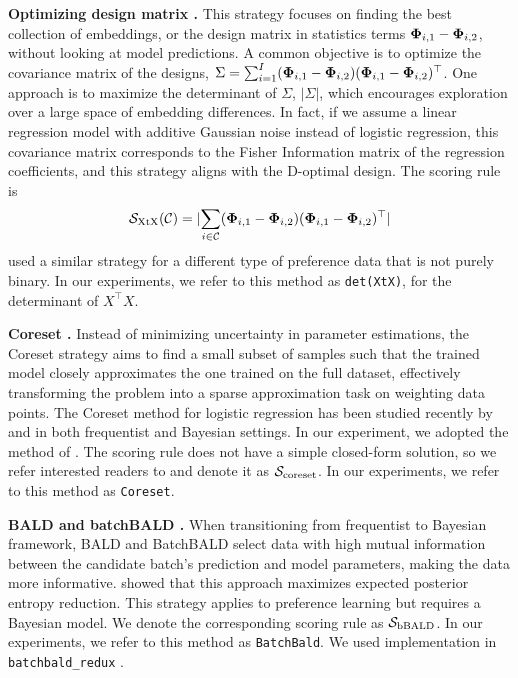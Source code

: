 \textbf{Optimizing design matrix \citep{mukherjee2024optimal}.} 
This strategy focuses on finding the best collection of embeddings, or the design matrix in statistics terms $\bm{\Phi}_{i,1} - \bm{\Phi}_{i,2}$, without looking at model predictions. A common objective is to optimize the covariance matrix of the designs, $\Sigma = \sum_{i=1}^I (\bm{\Phi}_{i,1} - \bm{\Phi}_{i,2})(\bm{\Phi}_{i,1} - \bm{\Phi}_{i,2})^\top$. One approach is to maximize the determinant of $\Sigma$, $|\Sigma|$, which encourages exploration over a large space of embedding differences. In fact, if we assume a linear regression model with additive Gaussian noise instead of logistic regression, this covariance matrix corresponds to the Fisher Information matrix of the regression coefficients, and this strategy aligns with the D-optimal design. The scoring rule is
\begin{equation}
    \mathcal{S}_{\text{XtX}}(\mathcal{C}) = \lvert \sum_{i\in \mathcal{C}} (\bm{\Phi}_{i,1}-\bm{\Phi}_{i,2})(\bm{\Phi}_{i,1}-\bm{\Phi}_{i,2})^\top\rvert
\end{equation}
\citet{mukherjee2024optimal} used a similar strategy for a different type of preference data that is not purely binary. In our experiments, we refer to this method as \texttt{det(XtX)}, for the determinant of $X^\top X$.

\textbf{Coreset \citep{huggins2016coresets,munteanu2018coresets}.}
Instead of minimizing uncertainty in parameter estimations, the Coreset strategy aims to find a small subset of samples such that the trained model closely approximates the one trained on the full dataset, effectively transforming the problem into a sparse approximation task on weighting data points. The Coreset method for logistic regression has been studied recently by \citet{munteanu2018coresets} and \citet{huggins2016coresets} in both frequentist and Bayesian settings. In our experiment, we adopted the method of \citet{huggins2016coresets}. The scoring rule does not have a simple closed-form solution, so we refer interested readers to \citet{huggins2016coresets} and denote it as $\mathcal{S}_{\text{coreset}}$. In our experiments, we refer to this method as \texttt{Coreset}.

\textbf{BALD and batchBALD \citep{houlsby2011bayesian, kirsch2019batchbald}.} When transitioning from frequentist to Bayesian framework, BALD \citep{houlsby2011bayesian} and BatchBALD \citep{kirsch2019batchbald} select data with high mutual information between the candidate batch's prediction and model parameters, making the data more informative. \citet{houlsby2011bayesian} showed that this approach maximizes expected posterior entropy reduction. This strategy applies to preference learning \citep{houlsby2011bayesian} but requires a Bayesian model. We denote the corresponding scoring rule as $\mathcal{S}_{\text{bBALD}}$. In our experiments, we refer to this method as \texttt{BatchBald}. We used implementation in \texttt{batchbald\_redux} \citep{kirsch2019batchbald}.


